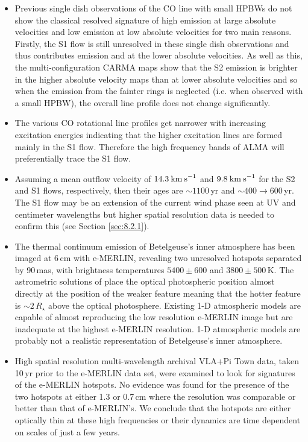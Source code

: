 \begin{itemize}
\item Previous single dish observations of the CO line with small HPBWs do not show the classical resolved signature of high emission at large absolute velocities and low emission at low absolute velocities for two main reasons. Firstly, the S1 flow is still unresolved in these single dish observations and thus contributes emission and at the lower absolute velocities. As well as this, the multi-configuration CARMA maps show that the S2 emission is brighter in the higher absolute velocity maps than at lower absolute velocities and so when the emission from the fainter rings is neglected (i.e. when observed with a small HPBW), the overall line profile does not change significantly.

\item The various CO rotational line profiles get narrower with increasing excitation energies indicating that the higher excitation lines are formed mainly in the S1 flow. Therefore the high frequency bands of ALMA will preferentially trace the S1 flow. 

\item Assuming a mean outflow velocity of $14.3\>{\rm km\>s}^{-1}$ and $9.8\>{\rm km\>s}^{-1}$ for the S2 and S1 flows, respectively, then their ages are $\sim 1100$\,yr and $\sim 400 \rightarrow 600$\,yr. The S1 flow may be an extension of the current wind phase seen at UV and centimeter wavelengths but higher spatial resolution data is needed to confirm this (see Section \ref{sec:8.2.1}).

\item The thermal continuum emission of Betelgeuse's inner atmosphere has been imaged at 6\,cm with e-MERLIN, revealing two unresolved hotspots separated by 90\,mas, with brightness temperatures $5400\pm 600$ and $3800\pm 500$\,K. The astrometric solutions of \cite{harper_2001} place the optical photospheric position almost directly at the position of the weaker feature meaning that the hotter feature is $\sim 2\,R_{\star}$ above the optical photosphere. Existing 1-D atmospheric models are capable of almost reproducing the low resolution e-MERLIN image but are inadequate at the highest e-MERLIN resolution. 1-D atmospheric models are probably not a realistic representation of Betelgeuse's inner atmosphere.

\item High spatial resolution multi-wavelength archival VLA+Pi Town data, taken 10\,yr prior to the e-MERLIN data set, were examined to look for signatures of the e-MERLIN hotspots. No evidence was found for the presence of the two hotspots at either 1.3 or 0.7\,cm where the resolution was comparable or better than that of e-MERLIN's. We conclude that the hotspots are either optically thin at these high frequencies or their dynamics are time dependent on scales of just a few years.


\end{itemize}
